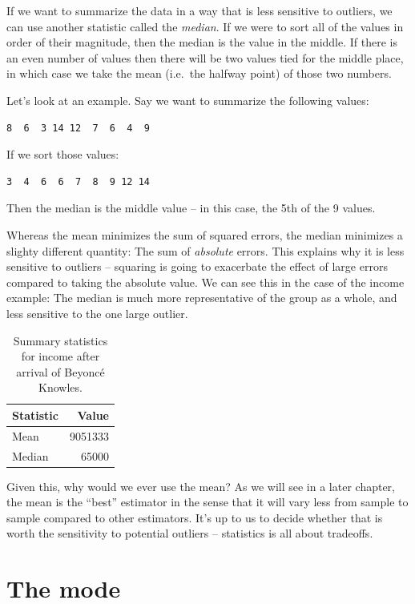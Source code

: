 \documentclass[12pt,]{book}
\theoremstyle{definition}
\theoremstyle{definition}
\theoremstyle{definition}
\theoremstyle{remark}
\begin{document}
If we want to summarize the data in a way that is less sensitive to outliers, we can use another statistic called the \emph{median}. If we were to sort all of the values in order of their magnitude, then the median is the value in the middle. If there is an even number of values then there will be two values tied for the middle place, in which case we take the mean (i.e.~the halfway point) of those two numbers.

Let's look at an example. Say we want to summarize the following values:

\begin{verbatim}
8  6  3 14 12  7  6  4  9
\end{verbatim}

If we sort those values:

\begin{verbatim}
3  4  6  6  7  8  9 12 14
\end{verbatim}

Then the median is the middle value -- in this case, the 5th of the 9 values.

Whereas the mean minimizes the sum of squared errors, the median minimizes a slighty different quantity: The sum of \emph{absolute} errors. This explains why it is less sensitive to outliers -- squaring is going to exacerbate the effect of large errors compared to taking the absolute value. We can see this in the case of the income example: The median is much more representative of the group as a whole, and less sensitive to the one large outlier.

\begin{table}

\caption{\label{tab:unnamed-chunk-20}Summary statistics for income after arrival of Beyoncé Knowles.}
\centering
\begin{tabular}[t]{l|r}
\hline
Statistic & Value\\
\hline
Mean & 9051333\\
\hline
Median & 65000\\
\hline
\end{tabular}
\end{table}

Given this, why would we ever use the mean? As we will see in a later chapter, the mean is the ``best'' estimator in the sense that it will vary less from sample to sample compared to other estimators. It's up to us to decide whether that is worth the sensitivity to potential outliers -- statistics is all about tradeoffs.

\hypertarget{the-mode}{%
\section{The mode}\label{the-mode}}
\end{document}
